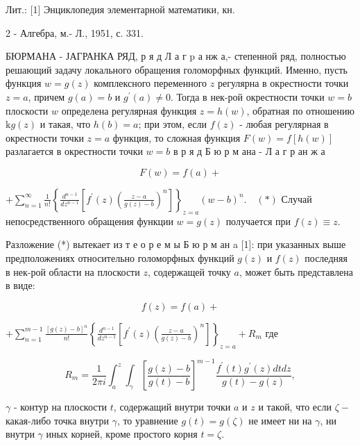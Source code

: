 \documentclass[10pt]{article}
\begin{document}
Лит.: [1] Энциклопедия элементарной математики, кн.

2 - Алгебра, м.- Л., 1951, с. 331.



БЮРМАНА - ЈАГРАНКА РЯД, р я д $Л$ а г p а нж а,- степенной ряд, полностью решающий задачу локального обращения голоморфных функций. Именно, пусть функция $w=g(z)$ комплексного переменного $z$ регулярна в окрестности точки $z=a$, причем $g(a)=b$ и $g^{\prime}(a) \neq 0$. Тогда в нек-рой окрестности точки $w=b$ плоскости $w$ определена регулярная функция $z=h(w)$, обратная по отношению $\mathrm{k} g(z)$ и такая, что $h(b)=a$; при этом, если $f(z)$ - любая регулярная в окрестности точки $z=a$ функция, то сложная функция $F(w)=f[h(w)]$ разлагается в окрестности точки $w=b$ в р я д Б ю р м ана - Л а г р ан ж а



\[

F(w)=f(a)+

\]



$+\sum_{n=1}^{\infty} \frac{1}{n !}\left\{\frac{d^{n-1}}{d z^{n-1}}\left[f^{\prime}(z)\left(\frac{z-a}{g(z)-b}\right)^{n}\right]\right\}_{z=a}(w-b)^{n} . \quad(*)$ Случай непосредственного обращения функции $w=g(z)$ получается при $f(z) \equiv z$.



Разложение (*) вытекает из т е о р е м ы Б ю р м ан a [1]: при указанных выше предположениях относительно голоморфных функций $g(z)$ и $f(z)$ последняя в нек-рой области на плоскости $z$, содержащей точку $a$, может быть представлена в виде:



\[

f(z)=f(a)+

\]



$+\sum_{n=1}^{m-1} \frac{[g(z)-b]^{n}}{n !}\left\{\frac{d^{n-1}}{d z^{n-1}}\left[f^{\prime}(z)\left(\frac{z-a}{g(z)-b}\right)^{n}\right]\right\}_{z=a}+R_{m}$ где



\[

R_{m}=\frac{1}{2 \pi i} \int_{a}^{z} \int_{\gamma}\left[\frac{g(z)-b}{g(t)-b}\right]^{m-1} \frac{f^{\prime}(t) g^{\prime}(z) d t d z}{g(t)-g(z)},

\]



$\gamma$ - контур на плоскости $t$, содержащий внутри точки $a$ и $z$ и такой, что если $\zeta-$ какая-либо точка внутри $\gamma$, то уравнение $g(t)=g(\zeta)$ не имеет ни на $\gamma$, ни внутри $\gamma$ иных корней, кроме простого корня $t=\zeta$.
\end{document}
